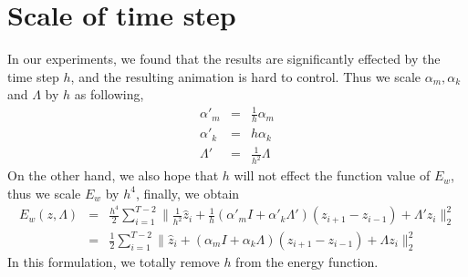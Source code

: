 \documentclass[9pt,twocolumn]{extarticle}
\begin{document}
\section{Scale of time step}\label{sec:scale-time-step}
In our experiments, we found that the results are significantly effected by the
time step $h$, and the resulting animation is hard to control. Thus we scale
$\alpha_m,\alpha_k$ and $\Lambda$ by $h$ as following,
\begin{eqnarray}
 \alpha'_m &=& \frac{1}{h}\alpha_m  \\
 \alpha'_k &=& h\alpha_k  \\
 \Lambda' &=& \frac{1}{h^2}\Lambda
\end{eqnarray}
On the other hand, we also hope that $h$ will not effect the function value of
$E_w$, thus we scale $E_w$ by $h^4$, finally, we obtain
\begin{eqnarray}
  E_w(z,\Lambda)&=&\frac{h^4}{2}\sum_{i=1}^{T-2}\|\frac{1}{h^2}\hat{z}_{i}+\frac{1}{h}(\alpha'_mI+\alpha'_k\Lambda')(z_{i+1}-z_{i-1})+\Lambda'
  z_i\|_2^2 \nonumber\\
  &=&\frac{1}{2}\sum_{i=1}^{T-2}\|\hat{z}_{i}+(\alpha_mI+\alpha_k\Lambda)(z_{i+1}-z_{i-1})+\Lambda
  z_i\|_2^2
\end{eqnarray}
In this formulation, we totally remove $h$ from the energy function. 
\end{document}
